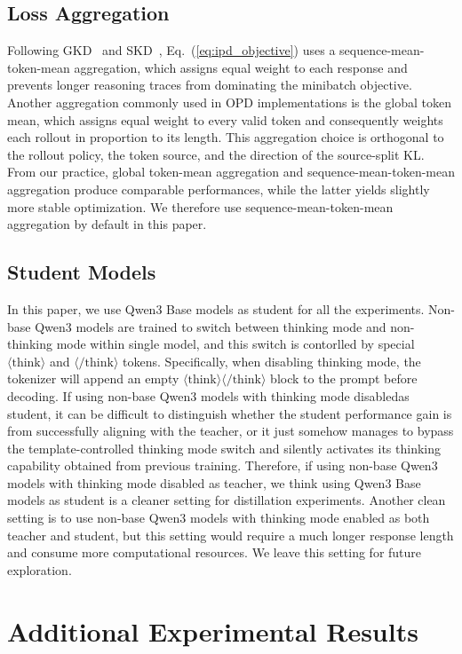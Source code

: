 \documentclass{article} %
\begin{document}
\subsection{Loss Aggregation}
Following GKD~\citep{gkd} and SKD~\citep{skd}, Eq.~(\ref{eq:ipd_objective}) uses a sequence-mean-token-mean aggregation, which assigns equal weight to each response and prevents longer reasoning traces from dominating the minibatch objective. Another aggregation commonly used in OPD implementations is the global token mean, which assigns equal weight to every valid token and consequently weights each rollout in proportion to its length. This aggregation choice is orthogonal to the rollout policy, the token source, and the direction of the source-split KL. From our practice, global token-mean aggregation and sequence-mean-token-mean aggregation produce comparable performances, while the latter yields slightly more stable optimization. We therefore use sequence-mean-token-mean aggregation by default in this paper. 

\subsection{Student Models}
In this paper, we use Qwen3 Base models as student for all the experiments. Non-base Qwen3 models are trained to switch between thinking mode and non-thinking mode within single model, and this switch is contorlled by special $\langle\text{think}\rangle$ and $\langle/\text{think}\rangle$ tokens. Specifically, when disabling thinking mode, the tokenizer will append an empty $\langle\text{think}\rangle\langle/\text{think}\rangle$ block to the prompt before decoding. If using non-base Qwen3 models with thinking mode disabledas student, it can be difficult to distinguish whether the student performance gain is from successfully aligning with the teacher, or it just somehow manages to bypass the template-controlled thinking mode switch and silently activates its thinking capability obtained from previous training. Therefore, if using non-base Qwen3 models with thinking mode disabled as teacher, we think using Qwen3 Base models as student is a cleaner setting for distillation experiments. Another clean setting is to use non-base Qwen3 models with thinking mode enabled as both teacher and student, but this setting would require a much longer response length and consume more computational resources. We leave this setting for future exploration.

\section{Additional Experimental Results}
\end{document}
